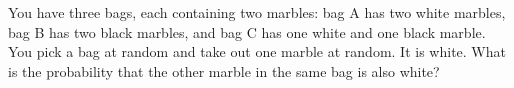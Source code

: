 You have three bags, each containing two marbles: bag A has two white marbles, bag B has two black marbles, and bag C has one white and one black marble. You pick a bag at random and take out one marble at random. It is white. What is the probability that the other marble in the same bag is also white?
